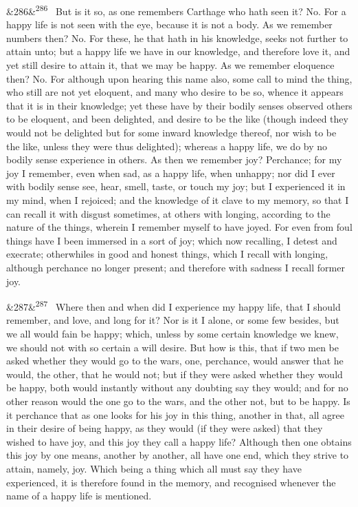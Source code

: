 \documentclass[12pt]{article}
\newcommand{\para}[1][]{\par\noindent\ifx&#1&\else\textsuperscript{\footnotesize #1}~\fi}
\begin{document}
\para[286] But is it so, as one remembers Carthage who hath seen it? No. For a happy life is not seen with the eye, because it is not a body. As we remember numbers then? No. For these, he that hath in his knowledge, seeks not further to attain unto; but a happy life we have in our knowledge, and therefore love it, and yet still desire to attain it, that we may be happy. As we remember eloquence then? No. For although upon hearing this name also, some call to mind the thing, who still are not yet eloquent, and many who desire to be so, whence it appears that it is in their knowledge; yet these have by their bodily senses observed others to be eloquent, and been delighted, and desire to be the like (though indeed they would not be delighted but for some inward knowledge thereof, nor wish to be the like, unless they were thus delighted); whereas a happy life, we do by no bodily sense experience in others. As then we remember joy? Perchance; for my joy I remember, even when sad, as a happy life, when unhappy; nor did I ever with bodily sense see, hear, smell, taste, or touch my joy; but I experienced it in my mind, when I rejoiced; and the knowledge of it clave to my memory, so that I can recall it with disgust sometimes, at others with longing, according to the nature of the things, wherein I remember myself to have joyed. For even from foul things have I been immersed in a sort of joy; which now recalling, I detest and execrate; otherwhiles in good and honest things, which I recall with longing, although perchance no longer present; and therefore with sadness I recall former joy.

\para[287] Where then and when did I experience my happy life, that I should remember, and love, and long for it? Nor is it I alone, or some few besides, but we all would fain be happy; which, unless by some certain knowledge we knew, we should not with so certain a will desire. But how is this, that if two men be asked whether they would go to the wars, one, perchance, would answer that he would, the other, that he would not; but if they were asked whether they would be happy, both would instantly without any doubting say they would; and for no other reason would the one go to the wars, and the other not, but to be happy. Is it perchance that as one looks for his joy in this thing, another in that, all agree in their desire of being happy, as they would (if they were asked) that they wished to have joy, and this joy they call a happy life? Although then one obtains this joy by one means, another by another, all have one end, which they strive to attain, namely, joy. Which being a thing which all must say they have experienced, it is therefore found in the memory, and recognised whenever the name of a happy life is mentioned.
\end{document}
